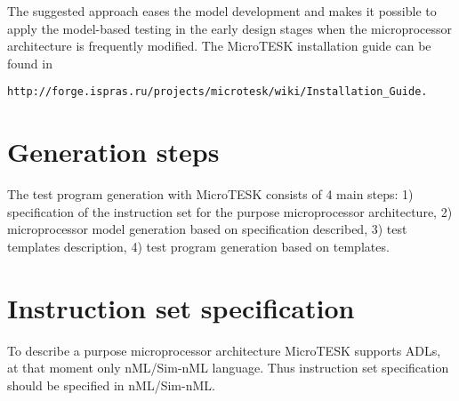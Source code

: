 \documentclass[oneside,final,12pt]{extreport}
\begin{document}
\bigskip

The suggested approach eases the model development and makes it possible to apply the model-based testing in the early design stages when the microprocessor architecture is frequently modified.
The MicroTESK installation guide can be found in 








\lstinline!http://forge.ispras.ru/projects/microtesk/wiki/Installation_Guide.!




\bigskip

\newpage

\section*{Generation steps}


The test program generation with MicroTESK consists of 4 main steps: 1) specification of the instruction set for the purpose microprocessor architecture, 2) microprocessor model generation based on specification described, 3) test templates description, 4) test program generation based on templates.
\bigskip


\newpage

\section*{Instruction set specification}


\bigskip

\itshape

\bfseries


\mdseries

\upshape

\bigskip

To describe a purpose microprocessor architecture MicroTESK supports ADLs, at that moment only nML/Sim-nML language. Thus instruction set specification should be specified in nML/Sim-nML. 

\bigskip
\end{document}
